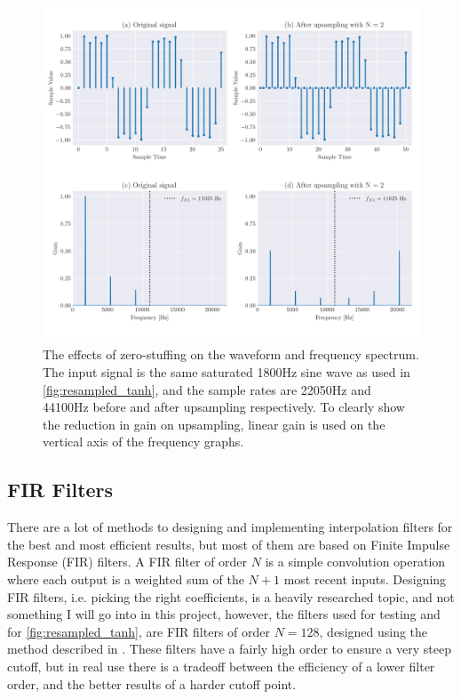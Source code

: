 \begin{figure}
  \centering
  \includegraphics[width=\textwidth]{Pictures/interpolation.png}
  \caption{The effects of zero-stuffing on the waveform and frequency spectrum. The input signal is the same saturated
    1800Hz sine wave as used in \autoref{fig:resampled_tanh}, and the sample rates are 22050Hz and 44100Hz before and  after upsampling respectively. To clearly show the
    reduction in gain on upsampling, linear gain is used on the vertical axis of the frequency graphs.}
  \label{fig:interpolation}
\end{figure}

\newpage
\subsection{FIR Filters}
\label{sec:fir_filters}

There are a lot of methods to designing and implementing interpolation filters for the best and most
efficient results, but most of them are based on Finite Impulse Response (FIR) filters. A FIR filter of order
$N$ is a simple convolution operation where each output is a weighted sum of the
$N + 1$ most recent inputs. Designing FIR filters, i.e. picking the right coefficients, is a
heavily researched topic\autocite{kahles2019oversampling, SORIA2013, thomas2009}, and not something I will go into in this project, however,
the filters used for testing and for \autoref{fig:resampled_tanh}, are FIR filters of order $N = 128$,
designed using the method described in \autocite{fiir}. These filters have a fairly high order to
ensure a very steep cutoff, but in real use there is a tradeoff between the efficiency of a lower filter
order, and the better results of a harder cutoff point.

